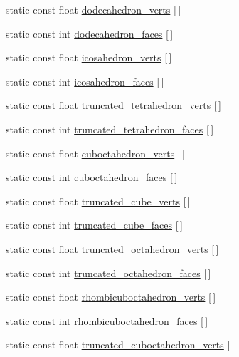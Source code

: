 \begin{DoxyCompactItemize}
\item 
static const float \hyperlink{namespacetrimesh_a07c136c3bb7adf31d11f25a808e7205d}{dodecahedron\+\_\+verts} \mbox{[}$\,$\mbox{]}
\item 
static const int \hyperlink{namespacetrimesh_a4e582a44ae8218e36703d98252fff8f1}{dodecahedron\+\_\+faces} \mbox{[}$\,$\mbox{]}
\item 
static const float \hyperlink{namespacetrimesh_ab0b640c1a4bf129f87cd75ad0c91b1c0}{icosahedron\+\_\+verts} \mbox{[}$\,$\mbox{]}
\item 
static const int \hyperlink{namespacetrimesh_a0f03d62179d3f32963dc31080cdad7a7}{icosahedron\+\_\+faces} \mbox{[}$\,$\mbox{]}
\item 
static const float \hyperlink{namespacetrimesh_a5a92f5a7d9dd3387cda735710f51bea2}{truncated\+\_\+tetrahedron\+\_\+verts} \mbox{[}$\,$\mbox{]}
\item 
static const int \hyperlink{namespacetrimesh_a522f5731027b1a8c2f56b1c29db46f3f}{truncated\+\_\+tetrahedron\+\_\+faces} \mbox{[}$\,$\mbox{]}
\item 
static const float \hyperlink{namespacetrimesh_a5f53c82abd2220810237437bc6c2f5af}{cuboctahedron\+\_\+verts} \mbox{[}$\,$\mbox{]}
\item 
static const int \hyperlink{namespacetrimesh_ade1638f83d9a62ed65daa5c093ca1497}{cuboctahedron\+\_\+faces} \mbox{[}$\,$\mbox{]}
\item 
static const float \hyperlink{namespacetrimesh_ad28438f14f0ad2e00724e7aa237bc42a}{truncated\+\_\+cube\+\_\+verts} \mbox{[}$\,$\mbox{]}
\item 
static const int \hyperlink{namespacetrimesh_a4cbf810c8c69a9eb024850085bcc3cec}{truncated\+\_\+cube\+\_\+faces} \mbox{[}$\,$\mbox{]}
\item 
static const float \hyperlink{namespacetrimesh_a97b0aae7cfd95aeb64259be27ad18f31}{truncated\+\_\+octahedron\+\_\+verts} \mbox{[}$\,$\mbox{]}
\item 
static const int \hyperlink{namespacetrimesh_a2bd0ac5d79b519df6361b95d327d30ef}{truncated\+\_\+octahedron\+\_\+faces} \mbox{[}$\,$\mbox{]}
\item 
static const float \hyperlink{namespacetrimesh_a36509c074cecc86d1087c3ecdffb1ff4}{rhombicuboctahedron\+\_\+verts} \mbox{[}$\,$\mbox{]}
\item 
static const int \hyperlink{namespacetrimesh_a26d7caf0c24cadc73cd49b78177bff8e}{rhombicuboctahedron\+\_\+faces} \mbox{[}$\,$\mbox{]}
\item 
static const float \hyperlink{namespacetrimesh_a63ef8ec13e1ae40c6280d1b2a8b494ae}{truncated\+\_\+cuboctahedron\+\_\+verts} \mbox{[}$\,$\mbox{]}

\end{DoxyCompactItemize}
